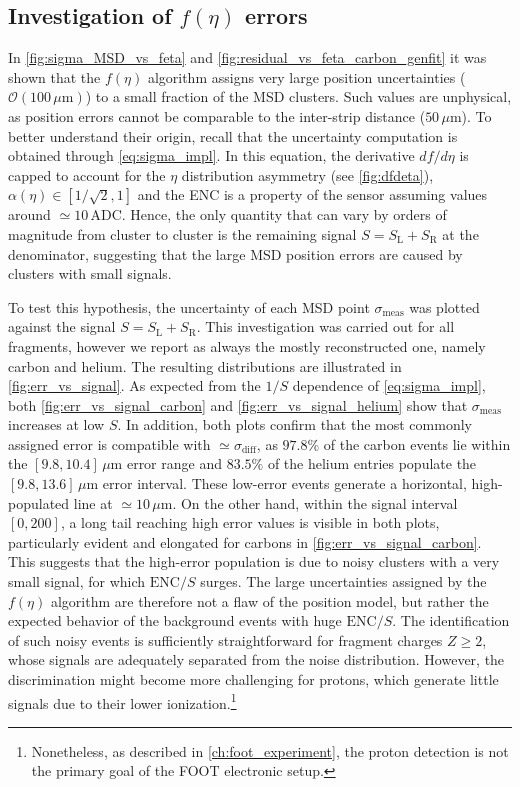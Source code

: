 \subsection{Investigation of \texorpdfstring{$f(\eta)$}{f(η)} errors}\label{ssec:feta_errors}
In \autoref{fig:sigma_MSD_vs_feta} and \autoref{fig:residual_vs_feta_carbon_genfit} it was shown that the $f(\eta)$ algorithm assigns very large position uncertainties ($\mathcal{O}(100\,\mu\mathrm{m})$) to a small fraction of the MSD clusters. Such values are unphysical, as position errors cannot be comparable to the inter-strip distance ($50\,\mu\mathrm{m}$). To better understand their origin, recall that the uncertainty computation is obtained through \autoref{eq:sigma_impl}. In this equation, the derivative $df/d\eta$ is capped to account for the $\eta$ distribution asymmetry (see \autoref{fig:dfdeta}), $\alpha(\eta)\in[1/\sqrt{2},1]$ and the ENC is a property of the sensor assuming values around $\simeq10\,\mathrm{ADC}$. Hence, the only quantity that can vary by orders of magnitude from cluster to cluster is the remaining signal $S=S_\text{L}+S_\text{R}$ at the denominator, suggesting that the large MSD position errors are caused by clusters with small signals.

To test this hypothesis, the uncertainty of each MSD point $\sigma_\text{meas}$ was plotted against the signal $S=S_\text{L}+S_\text{R}$. This investigation was carried out for all fragments, however we report as always the mostly reconstructed one, namely carbon and helium. The resulting distributions are illustrated in \autoref{fig:err_vs_signal}. As expected from the $1/S$ dependence of \autoref{eq:sigma_impl}, both \autoref{fig:err_vs_signal_carbon} and \autoref{fig:err_vs_signal_helium} show that $\sigma_\text{meas}$ increases at low $S$. In addition, both plots confirm that the most commonly assigned error is compatible with $\simeq\sigma_\text{diff}$, as $97.8\%$ of the carbon events lie within the $\left[9.8,10.4\right]\,\mu\mathrm{m}$ error range and $83.5\%$ of the helium entries populate the $\left[9.8,13.6\right]\,\mu\mathrm{m}$ error interval. These low-error events generate a horizontal, high-populated line at $\simeq10\,\mu\mathrm{m}$. On the other hand, within the signal interval $\left[0,200\right]$, a long tail reaching high error values is visible in both plots, particularly evident and elongated for carbons in \autoref{fig:err_vs_signal_carbon}. This suggests that the high-error population is due to noisy clusters with a very small signal, for which $\text{ENC}/S$ surges. The large uncertainties assigned by the $f(\eta)$ algorithm are therefore not a flaw of the position model, but rather the expected behavior of the background events with huge $\text{ENC}/S$. The identification of such noisy events is sufficiently straightforward for fragment charges $Z\geq2$, whose signals are adequately separated from the noise distribution. However, the discrimination might become more challenging for protons, which generate little signals due to their lower ionization.\footnote{Nonetheless, as described in \autoref{ch:foot_experiment}, the proton detection is not the primary goal of the FOOT electronic setup.}

